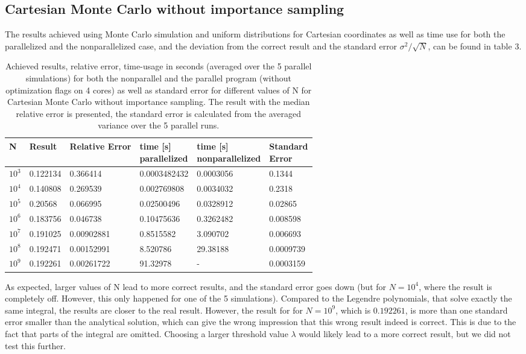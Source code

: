 \documentclass[10pt,a4paper]{article}
\begin{document}
\subsection{Cartesian Monte Carlo without importance sampling}
The results achieved using Monte Carlo simulation and uniform distributions for Cartesian coordinates as well as time use for both the parallelized and the nonparallelized case, and the deviation from the correct result and the standard error $\sigma^2/\sqrt{N}$, can be found in table 3.

\begin{table}[H]
\caption[Cartesian Monte Carlo without importance sampling]{Achieved results, relative error, time-usage in seconds (averaged over the 5 parallel simulations) for both the nonparallel and the parallel program (without optimization flags on 4 cores) as well as standard error for different values of N for Cartesian Monte Carlo without importance sampling. The result with the median relative error is presented, the standard error is calculated from the averaged variance over the 5 parallel runs.}
\begin{tabular}{|l|l|l|l|l|l|}
\hline
N          & Result   & Relative Error & \pbox{10cm}{time {[}s{]}\\ parallelized}  &  \pbox{10cm}{time {[}s{]}\\ nonparallelized} &  \pbox{10cm}{Standard\\ Error} \\ \hline
$10^3$ & 0.122134 & 0.366414   & 0.0003482432 & 0.0003056 & 0.1344    \\ \hline
$10^4$ & 0.140808 & 0.269539   & 0.002769808  & 0.0034032 & 0.2318    \\ \hline
$10^5$ & 0.20568  & 0.066995   & 0.02500496   & 0.0328912 & 0.02865   \\ \hline
$10^6$ & 0.183756 & 0.046738   & 0.10475636   & 0.3262482 & 0.008598  \\ \hline
$10^7$ & 0.191025 & 0.00902881 & 0.8515582    & 3.090702  & 0.006693  \\ \hline
$10^8$ & 0.192471 & 0.00152991 & 8.520786     & 29.38188  & 0.0009739 \\ \hline
$10^9$ & 0.192261 & 0.00261722 & 91.32978     & -         & 0.0003159 \\ \hline
\end{tabular}
\end{table}

As expected, larger values of N lead to more correct results, and the standard error goes down (but for $N=10^4$, where the result is completely off. However, this only happened for one of the 5 simulations).
Compared to the Legendre polynomials, that solve exactly the same integral, the results are closer to the real result. However, the result for for $N=10^9$, which is $0.192261$, is more than one standard error smaller than the analytical solution, which can give the wrong impression that this wrong result indeed is correct. This is due to the fact that parts of the integral are omitted. Choosing a larger threshold value $\lambda$ would likely lead to a more correct result, but we did not test this further. 
\end{document}
